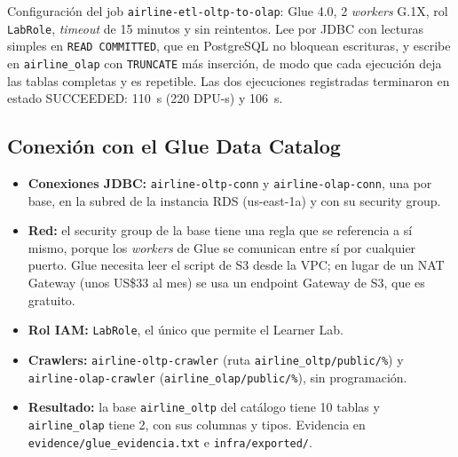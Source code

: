 \documentclass[10pt,letterpaper]{article}
\begin{document}
Configuración del job \texttt{airline-etl-oltp-to-olap}: Glue 4.0, 2 \emph{workers} G.1X, rol \texttt{LabRole}, \emph{timeout} de 15 minutos y sin reintentos. Lee por JDBC con lecturas simples en \texttt{READ COMMITTED}, que en PostgreSQL no bloquean escrituras, y escribe en \texttt{airline\_olap} con \texttt{TRUNCATE} más inserción, de modo que cada ejecución deja las tablas completas y es repetible. Las dos ejecuciones registradas terminaron en estado SUCCEEDED: 110~s (220 DPU-s) y 106~s.

\subsection{Conexión con el Glue Data Catalog}
\begin{itemize}
  \item \textbf{Conexiones JDBC:} \texttt{airline-oltp-conn} y \texttt{airline-olap-conn}, una por base, en la subred de la instancia RDS (us-east-1a) y con su security group.
  \item \textbf{Red:} el security group de la base tiene una regla que se referencia a sí mismo, porque los \emph{workers} de Glue se comunican entre sí por cualquier puerto. Glue necesita leer el script de S3 desde la VPC; en lugar de un NAT Gateway (unos US\$33 al mes) se usa un endpoint Gateway de S3, que es gratuito.
  \item \textbf{Rol IAM:} \texttt{LabRole}, el único que permite el Learner Lab.
  \item \textbf{Crawlers:} \texttt{airline-oltp-crawler} (ruta \texttt{airline\_oltp/public/\%}) y \texttt{airline-olap-crawler} (\texttt{airline\_olap/public/\%}), sin programación.
  \item \textbf{Resultado:} la base \texttt{airline\_oltp} del catálogo tiene 10 tablas y \texttt{airline\_olap} tiene 2, con sus columnas y tipos. Evidencia en \texttt{evidence/glue\_evidencia.txt} e \texttt{infra/exported/}.
\end{itemize}
\end{document}

